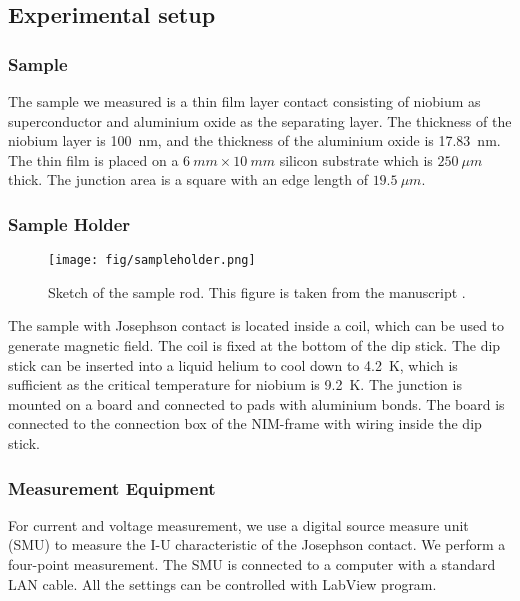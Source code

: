 \subsection{Experimental setup}

\subsubsection{Sample}
The sample we measured is a thin film layer contact consisting of niobium as superconductor and aluminium oxide as the separating layer. The thickness of the niobium layer is \SI{100}{nm}, and the thickness of the aluminium oxide is \SI{17.83}{nm}. The thin film is placed on a $\SI{6}{mm} \times \SI{10}{mm}$ silicon substrate which is $\SI{250}{\mu m}$ thick. The junction area is a square with an edge length of $\SI{19.5}{\mu m}$.

\subsubsection{Sample Holder}

\begin{figure}

\centering
\texttt{[image: fig/sampleholder.png]}

\caption{Sketch of the sample rod. This figure is taken from the manuscript \citep{manuscript}.}

\label{sampleholder}
\end{figure}

The sample with Josephson contact is located inside a coil, which can be used to generate magnetic field. The coil is fixed at the bottom of the dip stick. The dip stick can be inserted into a liquid helium to cool down to \SI{4.2}{K}, which is sufficient as the critical temperature for niobium is \SI{9.2}{K}. The junction is mounted on a board and connected to pads with aluminium bonds. The board is connected to the connection box of the NIM-frame with wiring inside the dip stick.

\subsubsection{Measurement Equipment}
For current and voltage measurement, we use a digital source measure unit (SMU) to measure the I-U characteristic of the Josephson contact. We perform a four-point measurement. The SMU is connected to a computer with a standard LAN cable. All the settings can be controlled with LabView program.

